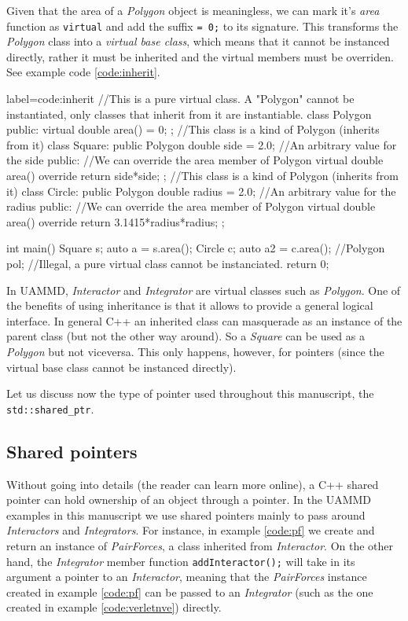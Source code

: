 \documentclass[twoside,openright,titlepage,numbers=noenddot,%
headinclude,footinclude,cleardoublepage=empty,abstract=on,
BCOR=5mm,fontsize=11pt, dvipsnames, paper=b5
]{scrreprt}
\def\ucpp{uammd_cpp_lexer.py:UAMMDCppLexer -x}
\newcommand{\uammd}{\gls{UAMMD}\xspace}
\begin{document}
Given that the area of a \emph{Polygon} object is meaningless, we can mark it's \emph{area} function as \texttt{virtual} and add the suffix \texttt{= 0;} to its signature. This transforms the \emph{Polygon} class into a \emph{virtual base class}, which means that it cannot be instanced directly, rather it must be inherited and the virtual members must be overriden. See example code \ref{code:inherit}.
\begin{code2} {label=code:inherit}
  //This is a pure virtual class. A "Polygon" cannot be instantiated, only classes that inherit from it are instantiable.
  class Polygon{
    public:
    virtual double area() = 0;
  };
  //This class is a kind of Polygon (inherits from it)
  class Square: public Polygon{
    double side = 2.0; //An arbitrary value for the side
    public:
    //We can override the area member of Polygon
    virtual double area() override{
      return side*side;
    }
  };
  //This class is a kind of Polygon (inherits from it)
  class Circle: public Polygon{
    double radius = 2.0; //An arbitrary value for the radius
    public:
    //We can override the area member of Polygon
    virtual double area() override{
      return 3.1415*radius*radius;
    }
  };

  int main(){
    Square s;
    auto a = s.area();
    Circle c;
    auto a2 = c.area();
    //Polygon pol; //Illegal, a pure virtual class cannot be instanciated.
    return 0;  
  }
\end{code2}

In \uammd, \emph{Interactor} and \emph{Integrator} are virtual classes such as \emph{Polygon}. One of the benefits of using inheritance is that it allows to provide a general logical interface. In general C++ an inherited class can masquerade as an instance of the parent class (but not the other way around). So a \emph{Square} can be used as a \emph{Polygon} but not viceversa. This only happens, however, for pointers (since the virtual base class cannot be instanced directly).

Let us discuss now the type of pointer used throughout this manuscript, the \texttt{std::shared_ptr}.

\subsection*{Shared pointers}
Without going into details (the reader can learn more online), a C++ shared pointer can hold ownership of an object through a pointer. In the \uammd examples in this manuscript we use shared pointers mainly to pass around \emph{Interactors} and \emph{Integrators}. For instance, in example \ref{code:pf} we create and return an instance of \emph{PairForces}, a class inherited from \emph{Interactor}. On the other hand, the \emph{Integrator} member function \texttt{addInteractor();} will take in its argument a pointer to an \emph{Interactor}, meaning that the \emph{PairForces} instance created in example \ref{code:pf} can be passed to an \emph{Integrator} (such as the one created in example \ref{code:verletnve}) directly.
\end{document}
